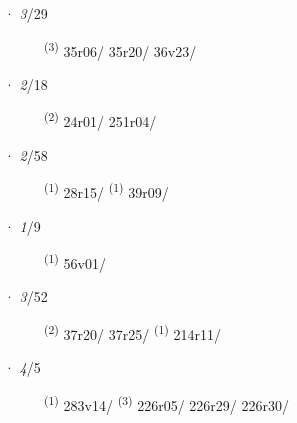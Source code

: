 \ENTRYEND
\noindent{} · \textit{3}/29 \LEMMALINE
\begin{description}
    \item[]  \textsuperscript{(3)} \mbox{35r06/} \mbox{35r20/} \mbox{36v23/}
\end{description}
\ENTRYEND
\noindent{} · \textit{2}/18 \LEMMALINE
\begin{description}
    \item[]  \textsuperscript{(2)} \mbox{24r01/} \mbox{251r04/}
\end{description}
\ENTRYEND
\noindent{} · \textit{2}/58 \LEMMALINE
\begin{description}
    \item[]  \textsuperscript{(1)} \mbox{28r15/} \textsuperscript{(1)} \mbox{39r09/}
\end{description}
\ENTRYEND
\noindent{} · \textit{1}/9 \LEMMALINE
\begin{description}
    \item[]  \textsuperscript{(1)} \mbox{56v01/}
\end{description}
\ENTRYEND
\noindent{} · \textit{3}/52 \LEMMALINE
\begin{description}
    \item[]  \textsuperscript{(2)} \mbox{37r20/} \mbox{37r25/} \textsuperscript{(1)} \mbox{214r11/}
\end{description}
\ENTRYEND
\noindent{} · \textit{4}/5 \LEMMALINE
\begin{description}
    \item[]  \textsuperscript{(1)} \mbox{283v14/} \CASEBREAK {} \textsuperscript{(3)} \mbox{226r05/} \mbox{226r29/} \mbox{226r30/}
\end{description}
\ENTRYEND

